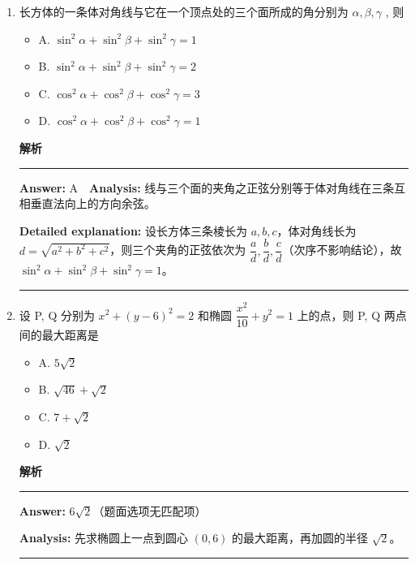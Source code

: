 \documentclass[UTF8,12pt,a4paper]{ctexart}
\newenvironment{examSolutionBox}{%
  \par\medskip\begingroup
  \setlength{\leftskip}{1.0em}\setlength{\rightskip}{0.9em}%
  \noindent\textcolor{SolutionTeal}{\bfseries\large 解析}\par
  \smallskip\noindent\textcolor{SolutionRule}{\rule{\dimexpr\linewidth-\leftskip-\rightskip\relax}{0.8pt}}\par
  \smallskip\color{SolutionInk}%
}{%
  \par\smallskip\noindent\textcolor{SolutionRule}{\rule{\dimexpr\linewidth-\leftskip-\rightskip\relax}{0.8pt}}\par
  \endgroup\medskip
}
\providecommand{\tightlist}{%
  \setlength{\itemsep}{0pt}\setlength{\parskip}{0pt}}
\begin{document}
\begin{enumerate}
\begin{examSolutionBox}
  \textbf{Detailed explanation:} 甲、乙的棒次组合为 \((1,2),(1,4),(2,4)\)，共 \(3\) 种。余下两棒从其余 \(4\) 人中有序选取，方法数为 \(A_4^2=12\)，总数 \(3\times12=36\)。

  \end{examSolutionBox}
\item
  长方体的一条体对角线与它在一个顶点处的三个面所成的角分别为 \(\alpha, \beta, \gamma\) , 则

  \begin{itemize}
  \tightlist
  \item
    A. \(\sin^{2}\alpha + \sin^{2}\beta + \sin^{2}\gamma = 1\)
  \item
    B. \(\sin^{2}\alpha + \sin^{2}\beta + \sin^{2}\gamma = 2\)
  \item
    C. \(\cos^{2}\alpha + \cos^{2}\beta + \cos^{2}\gamma = 3\)
  \item
    D. \(\cos^{2}\alpha + \cos^{2}\beta + \cos^{2}\gamma = 1\)
  \end{itemize}

  \begin{examSolutionBox}

  \textbf{Answer:} A　\textbf{Analysis:} 线与三个面的夹角之正弦分别等于体对角线在三条互相垂直法向上的方向余弦。

  \textbf{Detailed explanation:} 设长方体三条棱长为 \(a,b,c\)，体对角线长为 \(d=\sqrt{a^2+b^2+c^2}\)，则三个夹角的正弦依次为 \(\dfrac a d,\dfrac b d,\dfrac c d\)（次序不影响结论），故 \(\sin^2\alpha+\sin^2\beta+\sin^2\gamma=1\)。

  \end{examSolutionBox}
\item
  设 P, Q 分别为 \(x^{2} + (y - 6)^{2} = 2\) 和椭圆 \(\dfrac{x^{2}}{10} + y^{2} = 1\) 上的点，则 P, Q 两点间的最大距离是

  \begin{itemize}
  \tightlist
  \item
    A. \(5\sqrt{2}\)
  \item
    B. \(\sqrt{46} + \sqrt{2}\)
  \item
    C. \(7 + \sqrt{2}\)
  \item
    D. \(\sqrt{2}\)
  \end{itemize}

  \begin{examSolutionBox}

  \textbf{Answer:} \(6\sqrt2\)（题面选项无匹配项）

  \textbf{Analysis:} 先求椭圆上一点到圆心 \((0,6)\) 的最大距离，再加圆的半径 \(\sqrt2\)。


\end{examSolutionBox}
\end{enumerate}
\end{document}
